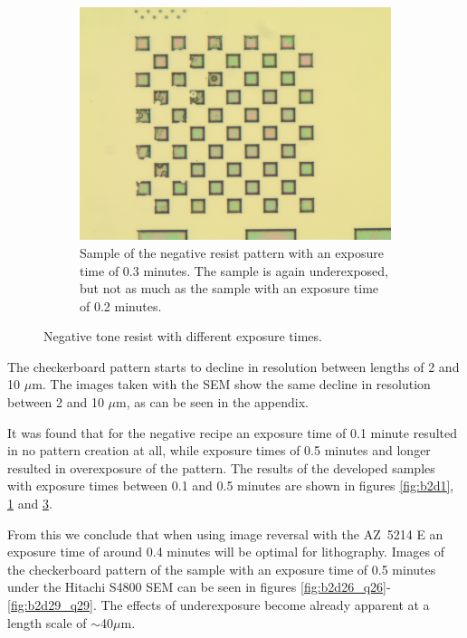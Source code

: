 \begin{figure}[!b]
\begin{subfigure}[t]{0.3\linewidth}
	    \label{fig:b2h1}
    \end{subfigure}
    \hfill
    \begin{subfigure}[t]{0.3\linewidth}
        \centering
        \includegraphics[width=\textwidth]{data/b2i1.jpg}
	    \caption{Sample of the negative resist pattern with an exposure time of 0.3 minutes. The sample is again underexposed, but not as much as the sample with an exposure time of 0.2 minutes.}
	    \label{fig:b2i1}
    \end{subfigure}
    \caption{Negative tone resist with different exposure times.}
\end{figure}

The checkerboard pattern starts to decline in resolution between lengths of 2 and 10 $\mu$m. The images taken with the SEM show the same decline in resolution between 2 and 10 $\mu$m, as can be seen in the appendix.


It was found that for the negative recipe an exposure time of 0.1 minute resulted in no pattern creation at all, while exposure times of 0.5 minutes and longer resulted in overexposure of the pattern. The results of the developed samples with exposure times between 0.1 and 0.5 minutes are shown in figures \ref{fig:b2d1}, \ref{fig:b2h1} and \ref{fig:b2i1}.


From this we conclude that when using image reversal with the AZ~5214 E an exposure time of around 0.4 minutes will be optimal for lithography. Images of the checkerboard pattern of the sample with an exposure time of 0.5 minutes under the Hitachi S4800 SEM can be seen in figures \ref{fig:b2d26_q26}-\ref{fig:b2d29_q29}. The effects of underexposure become already apparent at a length scale of $\sim$40$\mu$m. 


